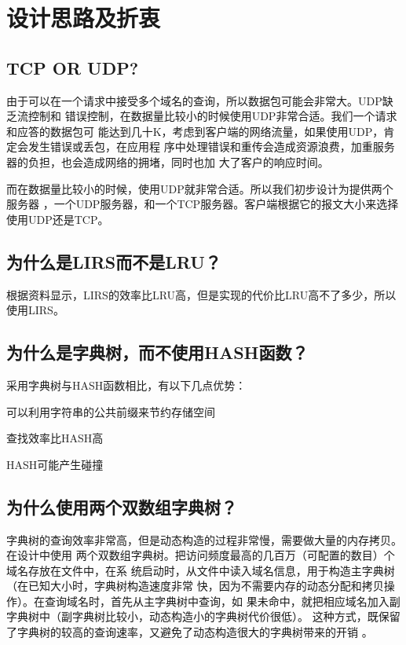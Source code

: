 %
%
\section{设计思路及折衷} 
\subsection{TCP OR UDP?}
由于可以在一个请求中接受多个域名的查询，所以数据包可能会非常大。UDP缺乏流控制和
错误控制，在数据量比较小的时候使用UDP非常合适。我们一个请求和应答的数据包可
能达到几十K，考虑到客户端的网络流量，如果使用UDP，肯定会发生错误或丢包，在应用程
序中处理错误和重传会造成资源浪费，加重服务器的负担，也会造成网络的拥堵，同时也加
大了客户的响应时间。
\par{而在数据量比较小的时候，使用UDP就非常合适。所以我们初步设计为提供两个服务器
，一个UDP服务器，和一个TCP服务器。客户端根据它的报文大小来选择使用UDP还是TCP。}
\subsection{为什么是LIRS而不是LRU？}
根据资料显示，LIRS的效率比LRU高，但是实现的代价比LRU高不了多少，所以使用LIRS。
\subsection{为什么是字典树，而不使用HASH函数？} 
采用字典树与HASH函数相比，有以下几点优势：
\begin{asparaenum}[1.]
\item{可以利用字符串的公共前缀来节约存储空间} 
\item{查找效率比HASH高\cite{DATA}}
\item{HASH可能产生碰撞} 
\end{asparaenum}
\subsection{为什么使用两个双数组字典树？}
字典树的查询效率非常高，但是动态构造的过程非常慢，需要做大量的内存拷贝。在设计中使用
两个双数组字典树。把访问频度最高的几百万（可配置的数目）个域名存放在文件中，在系
统启动时，从文件中读入域名信息，用于构造主字典树（在已知大小时，字典树构造速度非常
快，因为不需要内存的动态分配和拷贝操作）。在查询域名时，首先从主字典树中查询，如
果未命中，就把相应域名加入副字典树中（副字典树比较小，动态构造小的字典树代价很低）。
这种方式，既保留了字典树的较高的查询速率，又避免了动态构造很大的字典树带来的开销
。

%
